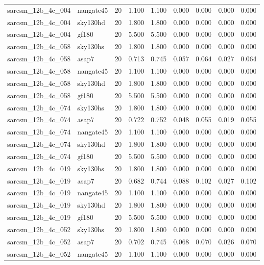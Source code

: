 \begin{tabular}{llrrrrrrr}
sarcsm\_12b\_4c\_004 & nangate45 & 20 & 1.100 & 1.100 & 0.000 & 0.000 & 0.000 & 0.000 \\
sarcsm\_12b\_4c\_004 & sky130hd & 20 & 1.800 & 1.800 & 0.000 & 0.000 & 0.000 & 0.000 \\
sarcsm\_12b\_4c\_004 & gf180 & 20 & 5.500 & 5.500 & 0.000 & 0.000 & 0.000 & 0.000 \\
sarcsm\_12b\_4c\_058 & sky130hs & 20 & 1.800 & 1.800 & 0.000 & 0.000 & 0.000 & 0.000 \\
sarcsm\_12b\_4c\_058 & asap7 & 20 & 0.713 & 0.745 & 0.057 & 0.064 & 0.027 & 0.064 \\
sarcsm\_12b\_4c\_058 & nangate45 & 20 & 1.100 & 1.100 & 0.000 & 0.000 & 0.000 & 0.000 \\
sarcsm\_12b\_4c\_058 & sky130hd & 20 & 1.800 & 1.800 & 0.000 & 0.000 & 0.000 & 0.000 \\
sarcsm\_12b\_4c\_058 & gf180 & 20 & 5.500 & 5.500 & 0.000 & 0.000 & 0.000 & 0.000 \\
sarcsm\_12b\_4c\_074 & sky130hs & 20 & 1.800 & 1.800 & 0.000 & 0.000 & 0.000 & 0.000 \\
sarcsm\_12b\_4c\_074 & asap7 & 20 & 0.722 & 0.752 & 0.048 & 0.055 & 0.019 & 0.055 \\
sarcsm\_12b\_4c\_074 & nangate45 & 20 & 1.100 & 1.100 & 0.000 & 0.000 & 0.000 & 0.000 \\
sarcsm\_12b\_4c\_074 & sky130hd & 20 & 1.800 & 1.800 & 0.000 & 0.000 & 0.000 & 0.000 \\
sarcsm\_12b\_4c\_074 & gf180 & 20 & 5.500 & 5.500 & 0.000 & 0.000 & 0.000 & 0.000 \\
sarcsm\_12b\_4c\_019 & sky130hs & 20 & 1.800 & 1.800 & 0.000 & 0.000 & 0.000 & 0.000 \\
sarcsm\_12b\_4c\_019 & asap7 & 20 & 0.682 & 0.744 & 0.088 & 0.102 & 0.027 & 0.102 \\
sarcsm\_12b\_4c\_019 & nangate45 & 20 & 1.100 & 1.100 & 0.000 & 0.000 & 0.000 & 0.000 \\
sarcsm\_12b\_4c\_019 & sky130hd & 20 & 1.800 & 1.800 & 0.000 & 0.000 & 0.000 & 0.000 \\
sarcsm\_12b\_4c\_019 & gf180 & 20 & 5.500 & 5.500 & 0.000 & 0.000 & 0.000 & 0.000 \\
sarcsm\_12b\_4c\_052 & sky130hs & 20 & 1.800 & 1.800 & 0.000 & 0.000 & 0.000 & 0.000 \\
sarcsm\_12b\_4c\_052 & asap7 & 20 & 0.702 & 0.745 & 0.068 & 0.070 & 0.026 & 0.070 \\
sarcsm\_12b\_4c\_052 & nangate45 & 20 & 1.100 & 1.100 & 0.000 & 0.000 & 0.000 & 0.000 \\

\end{tabular}
